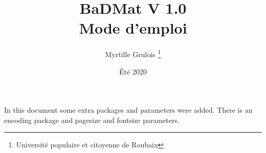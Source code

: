 \documentclass[12pt, A4, twoside]{article}
\title{BaDMat V 1.0 
\\ Mode d'emploi} %
\author{Myrtille Grulois \thanks{Université populaire et citoyenne de Roubaix}}
\date{Été 2020}
\begin{document}
\begin{titlepage}
\maketitle
\end{titlepage}

In this document some extra packages and parameters
were added. There is an encoding package
and pagesize and fontsize parameters.
\end{document}
